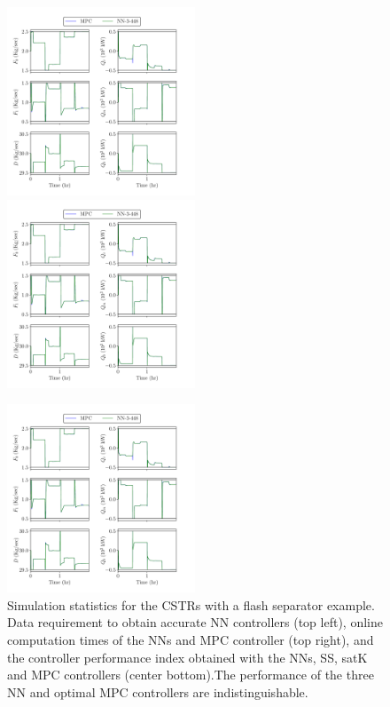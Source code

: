 \documentclass[preprint,5p, twocolumn, authoryear]{elsarticle}
\begin{document}
\begin{figure}[!h]
    \includegraphics[page=31, width=0.5\textwidth,
        height=0.27\textheight]{cstrs_comparision_plots.pdf} \hfill
        \includegraphics[page=34, width=0.5\textwidth,
        height=0.27\textheight]{cstrs_comparision_plots.pdf} \vfill
    \vspace{-0.1in}
    \begin{center}\includegraphics[page=33, width=0.5\textwidth,
        height=0.27\textheight]{cstrs_comparision_plots.pdf}
    \end{center}
    \vspace{-0.2in}
    \caption{Simulation statistics for the  
    CSTRs with a flash separator example. Data requirement to obtain accurate NN
    controllers (top left), online computation times of the NNs and MPC
    controller (top right), and the controller performance index obtained with
    the NNs, SS, satK and MPC controllers (center bottom).The performance of the
    three NN and optimal MPC controllers are indistinguishable.}	
    \label{fig:cstrs_statistics}
\end{figure}
\end{document}
